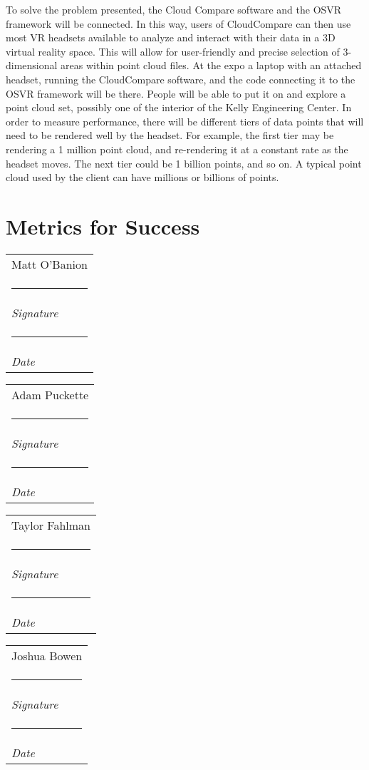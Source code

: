 \documentclass{article}
\makeatletter
\newcommand{\namesigdate}[2][5cm]{%
  \begin{tabular}{@{}p{#1}@{}}
    #2 \\[2\normalbaselineskip] \hrule \\[0pt]
    {\small \textit{Signature}} \\[2\normalbaselineskip] \hrule \\[0pt]
    {\small \textit{Date}}
  \end{tabular}
}
\makeatother
\begin{document}
To solve the problem presented, the Cloud Compare software and the OSVR framework will be connected. In this way, users of CloudCompare can then use most VR headsets available to analyze and interact with their data in a 3D virtual reality space. This will allow for user-friendly and precise selection of 3-dimensional areas within point cloud files. At the expo a laptop with an attached headset, running the CloudCompare software, and the code connecting it to the OSVR framework will be there. People will be able to put it on and explore a point cloud set, possibly one of the interior of the Kelly Engineering Center. In order to measure performance, there will be different tiers of data points that will need to be rendered well by the headset. For example, the first tier may be rendering a 1 million point cloud, and re-rendering it at a constant rate as the headset moves. The next tier could be 1 billion points, and so on. A typical point cloud used by the client can have millions or billions of points. 

\section*{Metrics for Success}

\vspace{2pc}

\noindent \namesigdate{Matt O'Banion} \hfill \namesigdate[3cm]{Adam Puckette}

\vspace{2pc}

\noindent \namesigdate{Taylor Fahlman} \hfill \namesigdate[3cm]{Joshua Bowen}
\end{document}
